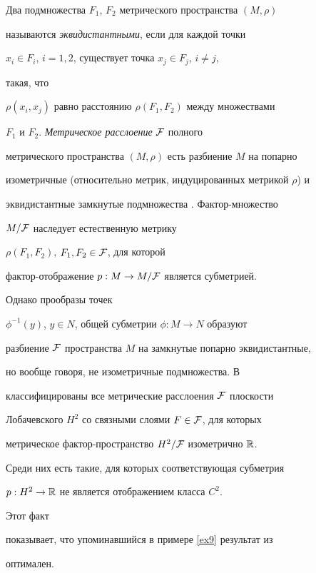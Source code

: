 \begin{exams}


\label{ex11}


Два подмножества $F_{1}$, $F_{2}$ метрического пространства $(M, \rho)$


называются {\it эквидистантными}, если для каждой точки


$x_{i} \in F_{i}$, $i=1,2$, существует точка $x_{j} \in F_{j}$, $i \neq j$,


такая, что


$\rho(x_{i},x_{j})$ равно расстоянию $\rho (F_{1},F_{2})$ между множествами


$F_{1}$ и $F_{2}$. {\it Метрическое расслоение} $\cal{F}$ полного


метрического пространства $(M, \rho)$ есть разбиение $M$ на попарно


изометричные (относительно метрик, индуцированных метрикой $\rho$) и


эквидистантные замкнутые подмножества \cite{VGE}. Фактор-множество


$M/\cal{F}$ наследует естественную метрику


$\rho (F_{1},F_{2})$, $F_{1},F_{2} \in \cal{F}$, для которой


фактор-отображение $p: M\rightarrow M/\cal{F}$ является субметрией.


Однако прообразы точек


$\phi^{-1}(y)$, $y \in N$, общей субметрии $\phi: M \rightarrow N$ образуют


разбиение $\cal{F}$ пространства $M$ на замкнутые попарно эквидистантные,


но вообще говоря, не изометричные подмножества. В \cite{VGE}


классифицированы все метрические расслоения $\cal{F}$ плоскости


Лобачевского $H^{2}$ со связными слоями $F \in \cal{F}$, для которых


метрическое фактор-пространство $H^{2}/\cal{F}$ изометрично $\Bbb{R}$.


Среди них есть такие, для которых соответствующая субметрия


$p: H^{2} \rightarrow \Bbb{R}$ не является отображением класса $C^{2}$.


Этот факт


показывает, что упоминавшийся в примере \ref{ex9} результат из \cite{BG}


оптимален.


\end{exams}





